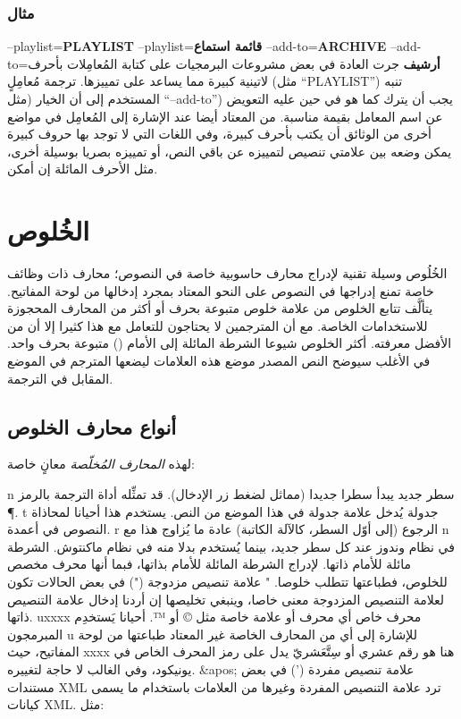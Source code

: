 \subsubsection{مثال}
\starttable[|l|l|]
\HL
\NC {} \NC {}\NC\AR
\HL
\NC --playlist={\bf PLAYLIST} \NC --playlist={\bf قائمة استماع}\NC\AR
\HL
\NC --add-to={\bf ARCHIVE} \NC --add-to={\bf أرشيف}\NC\AR
\HL
\stoptable
جرت العادة في بعض مشروعات البرمجيات على كتابة المُعامِلات بأحرف لاتينية
كبيرة مما يساعد على تمييزها. ترجمة مُعامِلٍ (مثل “PLAYLIST”) تنبه
المستخدم إلى أن الخيار (مثل ‪“--add-to”‬) يجب أن يترك كما هو في حين
عليه التعويض عن اسم المعامل بقيمة مناسبة. من المعتاد أيضا عند الإشارة
إلى المُعامِل في مواضع أخرى من الوثائق أن يكتب بأحرف كبيرة، وفي اللغات
التي لا توجد بها حروف كبيرة يمكن وضعه بين علامتي تنصيص لتمييزه عن باقي
النص، أو تمييزه بصريا بوسيلة أخرى، مثل الأحرف المائلة إن أمكن.

\section{الخُلوص}
الخُلُوص وسيلة تقنية لإدراج محارف حاسوبية خاصة في النصوص؛ محارف ذات
وظائف خاصة تمنع إدراجها في النصوص على النحو المعتاد بمجرد إدخالها من
لوحة المفاتيح. يتألَّف تتابع الخلوص من علامة خلوص متبوعة بحرف أو أكثر
من المحارف المحجوزة للاستخدامات الخاصة. مع أن المترجمين لا يحتاجون
للتعامل مع هذا كثيرا إلا أن من الأفضل معرفته. أكثر الخلوص شيوعا الشرطة
المائلة إلى الأمام ( ) متبوعة بحرف واحد. في الأغلب
سيوضح النص المصدر موضع هذه العلامات ليضعها المترجم في الموضع المقابل في
الترجمة.

\subsection{أنواع محارف الخلوص}
لهذه {\it المحارف المُخلّصة} معانٍ خاصة:

\starttable[|l|l|l|]
\HL
\NC {} \NC {} \NC
{}\NC\AR
\HL
\NC {} n  \NC سطر جديد \NC يبدأ سطرا جديدا (مماثل لضغط زر
الإدخال). قد تمثِّله أداة الترجمة بالرمز ¶.\NC\AR
\HL
\NC {} t  \NC جدولة \NC يُدخل علامة جدولة في هذا الموضع من
النص. يستخدم هذا أحيانا لمحاذاة النصوص في أعمدة.\NC\AR
\HL
\NC {} r  \NC الرجوع (إلى أوّل السطر، كالآلة الكاتبة) \NC
عادة ما يُزاوج هذا مع ‪ n‬ في نظام وندوز عند كل سطر
جديد، بينما يُستخدم بدلا منه في نظام ماكنتوش.\NC\AR
\HL
\NC {} {}  \NC الشرطة مائلة للأمام ذاتها. 
\NC لإدراج الشرطة المائلة للأمام بذاتها، فبما أنها محرف مخصص للخلوص،
فطباعتها تتطلب خلوصا.\NC\AR
\HL
\NC {} " \NC علامة تنصيص مزدوجة (") \NC في بعض الحالات
تكون لعلامة التنصيص المزدوجة معنى خاصا، وينبغي تخليصها إن أردنا إدخال
علامة التنصيص ذاتها.\NC\AR
\HL
\NC {} uxxxx  \NC محرف خاص \NC أي محرف أو علامة خاصة مثل ©
أو ™. أحيانا يَستخدِم المبرمجون ‪ u‬ للإشارة إلى أي من
المحارف الخاصة غير المعتاد طباعتها من لوحة المفاتيح، حيث xxxx هنا هو
رقم عشري أو سِتَّعَشريّ يدل على رمز المحرف الخاص في يونيكود، وفي الغالب
لا حاجة لتغييره.\NC\AR
\HL
\NC \&apos;  \NC علامة تنصيص مفردة (') \NC في بعض مستندات XML ترد علامة
التنصيص المفردة وغيرها من العلامات باستخدام ما يسمى كيانات XML. مثل:

